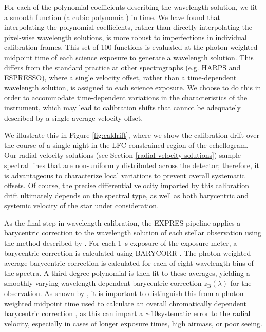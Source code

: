 For each of the polynomial coefficients describing the wavelength solution, we fit a smooth function (a cubic polynomial) in time. We have found that interpolating the polynomial coefficients, rather than directly interpolating the pixel-wise wavelength solutions, is more robust to imperfections in individual calibration frames. This set of 100 functions is evaluated at the photon-weighted midpoint time of each science exposure to generate a wavelength solution. This differs from the standard practice at other spectrographs (e.g. HARPS and ESPRESSO), where a single velocity offset, rather than a time-dependent wavelength solution, is assigned to each science exposure. We choose to do this in order to accommodate time-dependent variations in the characteristics of the instrument, which may lead to calibration shifts that cannot be adequately described by a single average velocity offset.

We illustrate this in Figure \ref{fig:caldrift}, where we show the calibration drift over the course of a single night in the LFC-constrained region of the echellogram. Our radial-velocity solutions (see Section \ref{radial-velocity-solutions}) sample spectral lines that are non-uniformly distributed across the detector; therefore, it is advantageous to characterize local variations to prevent overall systematic offsets. Of course, the precise differential velocity imparted by this calibration drift ultimately depends on the spectral type, as well as both barycentric and systemic velocity of the star under consideration.

As the final step in wavelength calibration, the EXPRES pipeline applies a barycentric correction to the wavelength solution of each stellar observation using the method described by \citet{blackman_accounting_2017}. For each 1~s exposure of the exposure meter, a barycentric correction is calculated using BARYCORR \citep{wright_barycentric_2014}. The photon-weighted average barycentric correction is calculated for each of eight wavelength bins of the spectra. A third-degree polynomial is then fit to these averages, yielding a smoothly varying wavelength-dependent barycentric correction \(z_\text{B}(\lambda)\) for the observation. As shown by \citet{tronsgaard_photon-weighted_2019}, it is important to distinguish this from a photon-weighted midpoint time used to calculate an overall chromatically dependent barycentric correction \citep[e.g.,][]{landoni_espresso_2014}, as this can impart a $\sim$10\cms systematic error to the radial velocity, especially in cases of longer exposure times, high airmass, or poor seeing.

